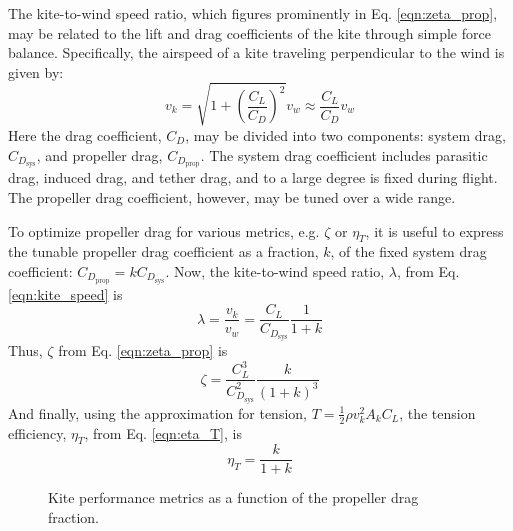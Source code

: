 \documentclass[11pt]{amsart}
\newcommand{\kite}{k}
\newcommand{\prop}{\mathrm{prop}}
\newcommand{\sys}{\mathrm{sys}}
\newcommand{\wind}{w}
\begin{document}
The kite-to-wind speed ratio, which figures prominently in
Eq. \ref{eqn:zeta_prop}, may be related to the lift and drag
coefficients of the kite through simple force balance.  Specifically,
the airspeed of a kite traveling perpendicular to the wind is given
by:
%
\begin{equation}
\label{eqn:kite_speed}
v_{\kite} = \sqrt{1 + \left(\frac{C_L}{C_D}\right)^2} v_{\wind}
          \approx \frac{C_L}{C_D} v_{\wind}
\end{equation}
%
Here the drag coefficient, $C_D$, may be divided into two components:
system drag, $C_{D_{\sys}}$, and propeller drag, $C_{D_{\prop}}$.  The
system drag coefficient includes parasitic drag, induced drag, and
tether drag, and to a large degree is fixed during flight.  The
propeller drag coefficient, however, may be tuned over a wide range.

To optimize propeller drag for various metrics, e.g. $\zeta$ or
$\eta_T$, it is useful to express the tunable propeller drag
coefficient as a fraction, $k$, of the fixed system drag coefficient:
$C_{D_{\prop}} = k C_{D_{\sys}}$.  Now, the kite-to-wind speed ratio,
$\lambda$, from Eq. \ref{eqn:kite_speed} is
%
\begin{equation}
\label{eqn:lambda}
\lambda = \frac{v_{\kite}}{v_{\wind}} = \frac{C_L}{C_{D_{\sys}}} \frac{1}{1 + k}
\end{equation}
%
Thus, $\zeta$ from Eq. \ref{eqn:zeta_prop} is
%
\begin{equation}
\zeta = \frac{C_L^3}{C_{D_{\sys}}^2} \frac{k}{(1+k)^3}
\end{equation}
%
And finally, using the approximation for tension,
$T = \frac{1}{2} \rho v_{\kite}^2 A_{\kite} C_L$, the tension efficiency, $\eta_T$,
from Eq. \ref{eqn:eta_T}, is
%
\begin{equation}
\eta_T = \frac{k}{1 + k}
\end{equation}

\begin{figure}
\begin{center}
\caption{Kite performance metrics as a function of the propeller drag
  fraction.}
\end{center}
\end{figure}
\end{document}
